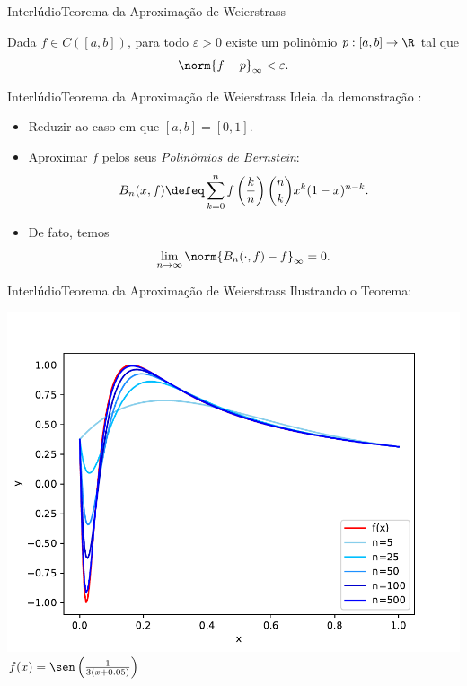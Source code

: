 \documentclass[13pt]{beamer}
\begin{document}
\begin{frame}{Interlúdio}{Teorema da Aproximação de Weierstrass}
    \begin{teo*}
        Dada \( f \in C ( [a, b] ) \), para todo \( \varepsilon > 0 \) existe um polinômio \( p : [a, b] \to \R \) tal que
        \begin{equation*}
            \norm{ f - p }_{ \infty } < \varepsilon
        .\end{equation*}
    \end{teo*}
\end{frame}

\begin{frame}{Interlúdio}{Teorema da Aproximação de Weierstrass}
    Ideia da demonstração \cite{weierstrass}:
    \begin{itemize}
        \item<1-> Reduzir ao caso em que \( [a, b] = [0, 1] \).
        \item<2-> Aproximar \( f \) pelos seus \emph{Polinômios de Bernstein}:
            \begin{equation*}
                B_{ n } ( x, f ) \defeq \sum_{ k=0 }^{ n } f
                \left( \frac{ k }{ n } \right)
                \binom{n}{k}
                x^{ k }
                ( 1 - x )^{ n - k }
            .\end{equation*}
        \item<3-> De fato, temos
            \begin{equation*}
                \lim_{ n \to \infty } \norm{ B_{ n } ( \cdot, f ) - f }_{ \infty } = 0
            .\end{equation*}
    \end{itemize}
\end{frame}

\begin{frame}{Interlúdio}{Teorema da Aproximação de Weierstrass}
    \vspace{3pt}
    Ilustrando o Teorema:
    \begin{center}
        \includegraphics[width=.75\textwidth]{../figuras/weierstrass_seno.pdf}
        \( f ( x ) = \sen \left( \frac{ 1 }{ 3 ( x + 0.05 ) } \right) \)
    \end{center}
\end{frame}
\end{document}
